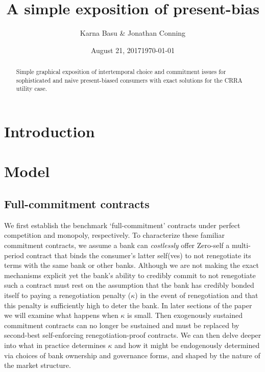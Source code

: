 \documentclass[11pt,english]{article}
\date{August 21, 2017}
\theoremstyle{plain}
\theoremstyle{plain}
\theoremstyle{plain}
\begin{document}
\title{A simple exposition of present-bias}
\author{Karna Basu \& Jonathan Conning}
\date{\today}
\maketitle

\begin{abstract}
    Simple graphical exposition of intertemporal choice and commitment issues for sophisticated and naive present-biased consumers with exact solutions for the CRRA utility case.
\end{abstract}

\tableofcontents

\section{Introduction}
 

\section{Model}


\subsection{Full-commitment contracts}

We first establish the benchmark `full-commitment' contracts under
perfect competition and monopoly, respectively. To characterize these
familiar commitment contracts, we assume a bank can \textit{costlessly}
offer Zero-self a multi-period contract that binds the consumer's
latter self(ves) to not renegotiate its terms with the same bank or
other banks. Although we are not making the exact mechanisms explicit
yet the bank's ability to credibly commit to not renegotiate such
a contract must rest on the assumption that the bank has credibly
bonded itself to paying a renegotiation penalty ($\kappa$) in the
event of renegotiation and that this penalty is sufficiently high
to deter the bank. In later sections of the paper we will examine
what happens when $\kappa$ is small. Then exogenously sustained commitment
contracts can no longer be sustained and must be replaced by second-best
self-enforcing renegotiation-proof contracts. We can then delve deeper
into what in practice determines $\kappa$ and how it might be endogenously
determined via choices of bank ownership and governance forms, and
shaped by the nature of the market structure.
\end{document}

